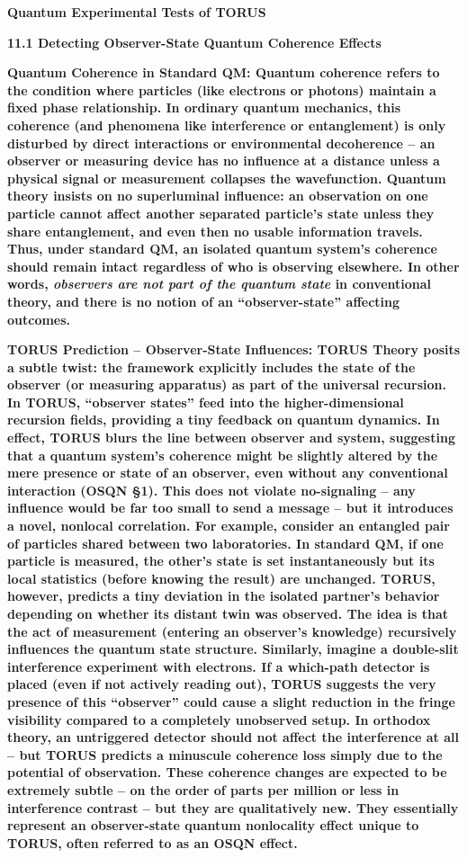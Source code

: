 \documentclass[]{article}
\date{}
\begin{document}
\textbf{Quantum Experimental Tests of TORUS}

\textbf{11.1 Detecting Observer-State Quantum Coherence Effects}

\textbf{Quantum Coherence in Standard QM: Quantum coherence refers to
the condition where particles (like electrons or photons) maintain a
fixed phase relationship. In ordinary quantum mechanics, this coherence
(and phenomena like interference or entanglement) is only disturbed by
direct interactions or environmental decoherence -- an observer or
measuring device has no influence at a distance unless a physical signal
or measurement collapses the wavefunction. Quantum theory insists on no
superluminal influence: an observation on one particle cannot affect
another separated particle's state unless they share entanglement, and
even then no usable information travels. Thus, under standard QM, an
isolated quantum system's coherence should remain intact regardless of
who is observing elsewhere. In other words, \emph{observers are not part
of the quantum state} in conventional theory, and there is no notion of
an ``observer-state'' affecting outcomes.}

\textbf{TORUS Prediction -- Observer-State Influences: TORUS Theory
posits a subtle twist: the framework explicitly includes the state of
the observer (or measuring apparatus) as part of the universal
recursion. In TORUS, ``observer states'' feed into the
higher-dimensional recursion fields, providing a tiny feedback on
quantum dynamics. In effect, TORUS blurs the line between observer and
system, suggesting that a quantum system's coherence might be slightly
altered by the mere presence or state of an observer, even without any
conventional interaction (OSQN §1). This does not violate no-signaling
-- any influence would be far too small to send a message -- but it
introduces a novel, nonlocal correlation. For example, consider an
entangled pair of particles shared between two laboratories. In standard
QM, if one particle is measured, the other's state is set
instantaneously but its local statistics (before knowing the result) are
unchanged. TORUS, however, predicts a tiny deviation in the isolated
partner's behavior depending on whether its distant twin was observed.
The idea is that the act of measurement (entering an observer's
knowledge) recursively influences the quantum state structure.
Similarly, imagine a double-slit interference experiment with electrons.
If a which-path detector is placed (even if not actively reading out),
TORUS suggests the very presence of this ``observer'' could cause a
slight reduction in the fringe visibility compared to a completely
unobserved setup. In orthodox theory, an untriggered detector should not
affect the interference at all -- but TORUS predicts a minuscule
coherence loss simply due to the potential of observation. These
coherence changes are expected to be extremely subtle -- on the order of
parts per million or less in interference contrast -- but they are
qualitatively new. They essentially represent an observer-state quantum
nonlocality effect unique to TORUS, often referred to as an OSQN
effect.}
\end{document}
